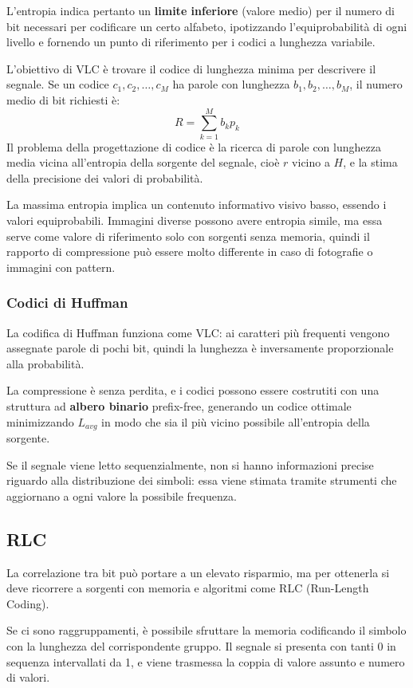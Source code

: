 L'entropia indica pertanto un \textbf{limite inferiore} (valore medio) per il numero di bit necessari per codificare un certo alfabeto, ipotizzando l'equiprobabilità di ogni livello e fornendo un punto di riferimento per i codici a lunghezza variabile. 

L'obiettivo di VLC è trovare il codice di lunghezza minima per descrivere il segnale. Se un codice $c_1, c_2, \dots, c_M$ ha parole con lunghezza $b_1, b_2, \dots, b_M$, il numero medio di bit richiesti è:
$$R = \sum_{k=1}^{M}b_kp_k$$
Il problema della progettazione di codice è la ricerca di parole con lunghezza media vicina all'entropia della sorgente del segnale, cioè $r$ vicino a $H$, e la stima della precisione dei valori di probabilità.

La massima entropia implica un contenuto informativo visivo basso, essendo i valori equiprobabili. Immagini diverse possono avere entropia simile, ma essa serve come valore di riferimento solo con sorgenti senza memoria, quindi il rapporto di compressione può essere molto differente in caso di fotografie o immagini con pattern.

\subsubsection{Codici di Huffman}
La codifica di Huffman funziona come VLC: ai caratteri più frequenti vengono assegnate parole di pochi bit, quindi la lunghezza è inversamente proporzionale alla probabilità.

La compressione è senza perdita, e i codici possono essere costrutiti con una struttura ad \textbf{albero binario} prefix-free, generando un codice ottimale minimizzando $L_{avg}$ in modo che sia il più vicino possibile all'entropia della sorgente.

Se il segnale viene letto sequenzialmente, non si hanno informazioni precise riguardo alla distribuzione dei simboli: essa viene stimata tramite strumenti che aggiornano a ogni valore la possibile frequenza.

\subsection{RLC}
La correlazione tra bit può portare a un elevato risparmio, ma per ottenerla si deve ricorrere a sorgenti con memoria e algoritmi come RLC  (Run-Length Coding). 

Se ci sono raggruppamenti, è possibile sfruttare la memoria codificando il simbolo con la lunghezza del corrispondente gruppo. Il segnale si presenta con tanti 0 in sequenza intervallati da 1, e viene trasmessa la coppia di valore assunto e numero di valori. 

